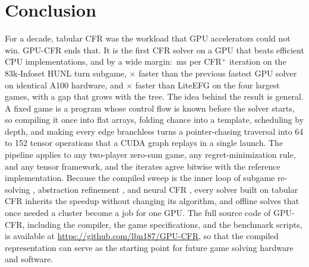 \section{Conclusion}
\label{sec:conclusion}

For a decade, tabular CFR was the workload that GPU accelerators could not win. GPU-CFR
ends that. It is the first CFR solver on a GPU that beats efficient CPU
implementations, and by a wide margin: \turnSteadyMs\,ms per CFR$^{+}$ iteration on
the 83k-Infoset HUNL turn subgame, \kimGraphRange$\times$ faster than the previous
fastest GPU solver \cite{kim2026parallelizing} on identical A100 hardware, and
\liteGraphLargestRange$\times$ faster than LiteEFG \cite{liu2024liteefg} on the four largest games, with a gap
that grows with the tree. The idea behind the result is general. A fixed game is a
program whose control flow is known before the solver starts, so compiling it once into
flat arrays, folding chance into a template, scheduling by depth, and making every edge
branchless turns a pointer-chasing traversal into 64 to 152 tensor operations that a
CUDA graph replays in a single launch. The pipeline applies to any two-player
zero-sum game, any regret-minimization rule, and any tensor framework, and the iterates
agree bitwise with the reference implementation. Because the compiled sweep is the inner loop of subgame re-solving
\cite{burch2014solving,li2026real}, abstraction refinement
\cite{li2024rl,li2025efficient,li2026effective,li2026abstraction}, and neural CFR
\cite{brown2019deep}, every solver built on tabular CFR inherits the
speedup without changing its algorithm, and offline solves that once needed a cluster
become a job for one GPU. The full source code of GPU-CFR, including the compiler,
the game specifications, and the benchmark scripts, is available at
\url{https://github.com/lbn187/GPU-CFR}, so that the compiled representation can
serve as the starting point for future game solving hardware and software.
